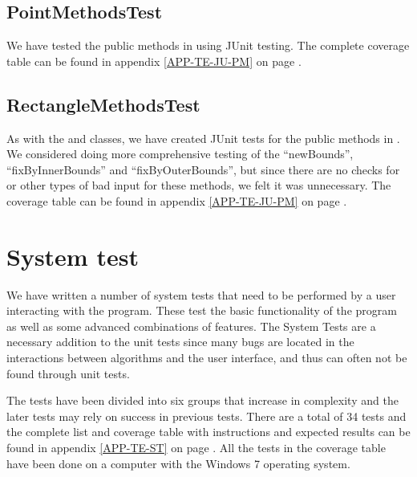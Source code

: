 \subsection{PointMethodsTest}
\label{TEST-JU-PMT}
We have tested the public methods in  using JUnit testing.
The complete coverage table can be found in appendix \ref{APP-TE-JU-PM} on page
\pageref{APP-TE-JU-PM}.

\subsection{RectangleMethodsTest}
\label{TEST-JU-RMT}
As with the  and  classes, we have created
JUnit tests for the public methods in . We considered
doing more comprehensive testing of the ``newBounds'', ``fixByInnerBounds'' and
``fixByOuterBounds'', but since there are no checks for  or other
types of bad input for these methods, we felt it was unnecessary. The coverage
table can be found in appendix \ref{APP-TE-JU-PM} on page
\pageref{APP-TE-JU-PM}.

\section{System test}
\label{TEST-ST}
We have written a number of system tests that need to be performed by a
user interacting with the program. These test the basic functionality of the
program as well as some advanced combinations of features. The System Tests are
a necessary addition to the unit tests since many bugs are located in the
interactions between algorithms and the user interface, and thus can often not
be found through unit tests. 

The tests have been divided into six groups that increase in
complexity and the later tests may rely on success in previous tests. There are
a total of 34 tests and the complete list and coverage table with instructions
and expected results can be found in appendix \ref{APP-TE-ST} on page
\pageref{APP-TE-ST}. All the tests in the coverage table have been done on a
computer with the Windows 7 operating system.